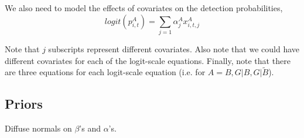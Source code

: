 \documentclass{article}
\begin{document}
We also need to model the effects of covariates on the detection
probabilities,
\begin{equation}
  logit(p_{i, t}^A) = \sum_{j=1} \alpha_j^A x_{i, t, j}^A
\end{equation}

Note that $j$ subscripts represent different covariates.  Also note
that we could have different covariates for each of the logit-scale
equations.  Finally, note that there are three equations for each
logit-scale equation (i.e. for $A = B, G|B, G|\tilde{B}$).

\subsection{Priors}

Diffuse normals on $\beta$'s and $\alpha$'s.
\end{document}
